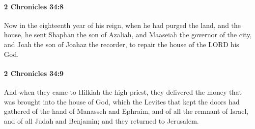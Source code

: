 		\paragraph{2 Chronicles 34:8} %
			\label{2CHRONICLES-34-8}

			Now in the eighteenth year of his reign, when he had purged the land, and the house, he sent Shaphan the son of Azaliah, and Maaseiah the governor of the city, and Joah the son of Joahaz the recorder, to repair the house of the LORD his God.


		\paragraph{2 Chronicles 34:9} %
			\label{2CHRONICLES-34-9}

			And when they came to Hilkiah the high priest, they delivered the money that was brought into the house of God, which the Levites that kept the doors had gathered of the hand of Manasseh and Ephraim, and of all the remnant of Israel, and of all Judah and Benjamin; and they returned to Jerusalem.

